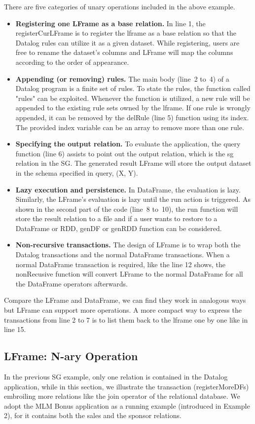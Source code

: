 There are five categories of unary operations included in the above example. 
\begin{itemize}
	\item \textbf{Registering one LFrame as a base relation.} In line 1, the registerCurLFrame is to register the lframe as a base relation so that the Datalog rules can utilize it as a given dataset. While registering, users are free to rename the dataset's columns and  LFrame will map the columns according to the order of appearance. 
	\item \textbf{Appending (or removing) rules.} The main body (line~2 to~4) of a Datalog program is a finite set of rules. To state the rules, the function called "rules" can be exploited. Whenever the function is utilized,  a new rule will be appended to the existing rule sets owned by the lframe.
	If one rule is wrongly appended, it can be removed by the delRule (line 5) function using its index. The provided index variable can be an array  to remove more than one rule.
	\item \textbf{Specifying the output relation.} To evaluate the application, the query function (line 6)  assists to point out the output relation, which is the sg relation in the SG. The generated result LFrame will store the output dataset in the schema specified in query, (X, Y).  
	\item \textbf{Lazy execution and persistence.} In DataFrame, the evaluation is lazy. Similarly, the LFrame's evaluation is lazy until the run action is triggered.  As shown in the second part of the code (line~8 to~10), the run function will store the result relation to a file and if a user wants to restore to a DataFrame or RDD,  genDF or genRDD function can be considered. 
	\item \textbf{Non-recursive transactions.} The design of LFrame is to wrap both the Datalog transactions and the normal DataFrame transactions. When a normal DataFrame transaction is required, like the line 12 shows, the nonRecusive function will convert LFrame to the normal DataFrame for all the DataFrame operators afterwards. 
\end{itemize}
Compare the LFrame and DataFrame, we can find they work in  analogous ways  but LFrame can support more operations. A more compact way to express the transactions from line 2 to 7 is to list them back to the lframe one by one like in line 15. 
\subsection{LFrame: N-ary Operation}
\label{sec:nary}
In the previous SG example, only one relation is contained in the Datalog application, while in this section, we illustrate the transaction (registerMoreDFs)  embroiling more relations like the join operator of the relational database. We adopt the MLM Bonus application as a running example (introduced in Example 2), for it contains both the sales and the sponsor relations. 

